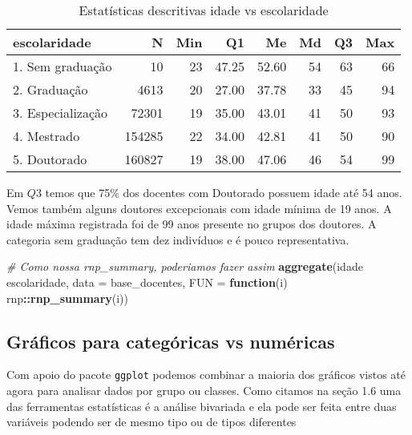 \documentclass[12pt,]{style/krantz}
\makeatletter
\newenvironment{Shaded}{\begin{snugshade}}{\end{snugshade}}
\newcommand{\CommentTok}[1]{\textcolor[rgb]{0.56,0.35,0.01}{\textit{#1}}}
\newcommand{\ControlFlowTok}[1]{\textcolor[rgb]{0.13,0.29,0.53}{\textbf{#1}}}
\newcommand{\DataTypeTok}[1]{\textcolor[rgb]{0.13,0.29,0.53}{#1}}
\newcommand{\KeywordTok}[1]{\textcolor[rgb]{0.13,0.29,0.53}{\textbf{#1}}}
\newcommand{\NormalTok}[1]{#1}
\newcommand{\OperatorTok}[1]{\textcolor[rgb]{0.81,0.36,0.00}{\textbf{#1}}}
\newcommand{\StringTok}[1]{\textcolor[rgb]{0.31,0.60,0.02}{#1}}
\newenvironment{kframe}{%
\medskip{}
\setlength{\fboxsep}{.8em}
 \def\at@end@of@kframe{}%
 \ifinner\ifhmode%
  \def\at@end@of@kframe{\end{minipage}}%
  \begin{minipage}{\columnwidth}%
 \fi\fi%
 \def\FrameCommand##1{\hskip\@totalleftmargin \hskip-\fboxsep
 \colorbox{shadecolor}{##1}\hskip-\fboxsep
     \hskip-\linewidth \hskip-\@totalleftmargin \hskip\columnwidth}%
 \MakeFramed {\advance\hsize-\width
   \@totalleftmargin\z@ \linewidth\hsize
   \@setminipage}}%
 {\par\unskip\endMakeFramed%
 \at@end@of@kframe}
\renewenvironment{Shaded}{\begin{kframe}}{\end{kframe}}
\theoremstyle{definition}
\theoremstyle{definition}
\theoremstyle{definition}
\theoremstyle{remark}
\makeatother
\begin{document}
\begin{table}[!h]

\caption{\label{tab:tab11}Estatísticas descritivas idade vs escolaridade}
\centering
\begin{tabular}{lrrrrrrr}
\toprule
escolaridade & N & Min & Q1 & Me & Md & Q3 & Max\\
\midrule
1. Sem graduação & 10 & 23 & 47.25 & 52.60 & 54 & 63 & 66\\
2. Graduação & 4613 & 20 & 27.00 & 37.78 & 33 & 45 & 94\\
3. Especialização & 72301 & 19 & 35.00 & 43.01 & 41 & 50 & 93\\
4. Mestrado & 154285 & 22 & 34.00 & 42.81 & 41 & 50 & 90\\
5. Doutorado & 160827 & 19 & 38.00 & 47.06 & 46 & 54 & 99\\
\bottomrule
\end{tabular}
\end{table}

Em \(Q3\) temos que 75\% dos docentes com Doutorado possuem idade até 54 anos. Vemos também alguns doutores excepcionais com idade mínima de 19 anos. A idade máxima registrada foi de 99 anos presente no grupos dos doutores. A categoria sem graduação tem dez indivíduos e é pouco representativa.

\begin{Shaded}
\begin{Highlighting}[]
\CommentTok{# Como nossa rnp_summary, poderiamos fazer assim}
\KeywordTok{aggregate}\NormalTok{(idade }\OperatorTok{~}\StringTok{ }\NormalTok{escolaridade,}
          \DataTypeTok{data =}\NormalTok{ base_docentes,}
          \DataTypeTok{FUN =} \ControlFlowTok{function}\NormalTok{(i) rnp}\OperatorTok{::}\KeywordTok{rnp_summary}\NormalTok{(i))}
\end{Highlighting}
\end{Shaded}

\hypertarget{graficos-para-categoricas-vs-numericas}{%
\subsection{Gráficos para categóricas vs numéricas}\label{graficos-para-categoricas-vs-numericas}}

Com apoio do pacote \texttt{ggplot} podemos combinar a maioria dos gráficos vistos até agora para analisar dados por grupo ou classes. Como citamos na seção 1.6 uma das ferramentas estatísticas é a análise bivariada e ela pode ser feita entre duas variáveis podendo ser de mesmo tipo ou de tipos diferentes
\end{document}

